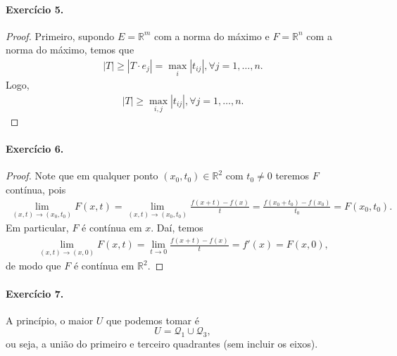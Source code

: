 \documentclass[12pt,a4paper]{article}
\newcommand{\R}{\mathbb{R}}
\begin{document}
\paragraph{Exercício 5.}
    \begin{proof}
        Primeiro, supondo $E = \R^m$ com a norma do máximo e $F = \R^n$ com
        a norma do máximo, temos que
        \begin{align*}
            |T| \geq |T\cdot e_j| = \max_i |t_{ij}|, \forall j = 1, \dots, n.
        \end{align*}
        Logo,
        \begin{align*}
            |T| \geq \max_{i,j} |t_{ij}|, \forall j = 1, \dots, n.
        \end{align*}
    \end{proof}
\paragraph{Exercício 6.}
    \begin{proof}
        Note que em qualquer ponto $(x_0, t_0)\in\R^2$ com $t_0\neq 0$ teremos
        $F$ contínua, pois
        \begin{align*}
            \lim_{(x,t)\to (x_0,t_0)} F(x,t)
            = \lim_{(x,t)\to (x_0,t_0)} \frac{f(x+t) - f(x)}{t}
            = \frac{f(x_0+t_0) - f(x_0)}{t_0}
            = F(x_0, t_0).
        \end{align*}
        Em particular, $F$ é contínua em $x$. Daí, temos
        \begin{align*}
            \lim_{(x,t) \to (x, 0)} F(x,t)
            = \lim_{t\to 0} \frac{f(x+t) - f(x)}{t}
            = f'(x)
            = F(x,0),
        \end{align*}
        de modo que $F$ é contínua em $\R^2$.
    \end{proof}
\paragraph{Exercício 7.}
    A princípio, o maior $U$ que podemos tomar é
    \begin{equation*}
        U = \mathcal{Q}_1 \cup \mathcal{Q}_3,
    \end{equation*}
    ou seja, a união do primeiro e terceiro quadrantes (sem incluir os eixos).
\end{document}
